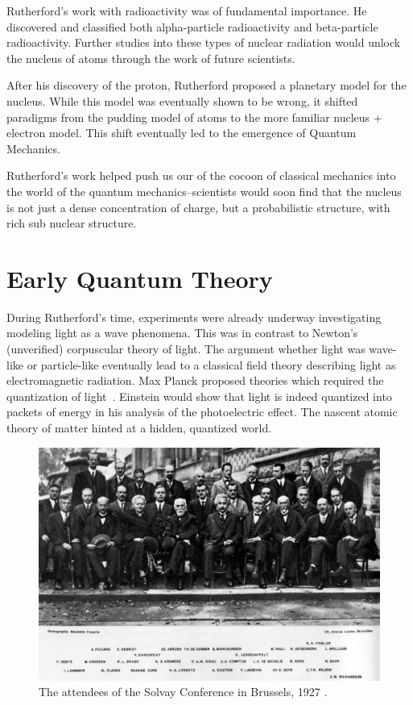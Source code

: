 Rutherford's work with radioactivity was of fundamental importance. He
discovered and classified both alpha-particle radioactivity and beta-particle
radioactivity. Further studies into these types of nuclear radiation would
unlock the nucleus of atoms through the work of future scientists.

After his discovery of the proton, Rutherford proposed a planetary model for the
nucleus. While this model was eventually shown to be wrong, it shifted paradigms
from the pudding model of atoms to the more familiar nucleus + electron model.
This shift eventually led to the emergence of Quantum Mechanics.

Rutherford's work helped push us our of the cocoon of classical mechanics into
the world of the quantum mechanics--scientists would soon find that the nucleus
is not just a dense concentration of charge, but a probabilistic structure, with
rich sub nuclear structure.

\clearpage
\section{Early Quantum Theory}

During Rutherford's time, experiments were already underway investigating
modeling light as a wave phenomena. This was in contrast to Newton's
(unverified) corpuscular theory of light. The argument whether light was
wave-like or particle-like eventually lead to a classical field theory
describing light as electromagnetic radiation. Max Planck proposed theories
which required the quantization of light~\cite{Planck1901}.  Einstein would show
that light is indeed quantized into packets of energy in his analysis of the
photoelectric effect. The nascent atomic theory of matter hinted at a hidden,
quantized world.

\begin{figure}
	\centering
	\includegraphics[width=\linewidth]{./figures/solvay.jpg}
	\caption{
		The attendees of the Solvay Conference in Brussels, 1927
		 \cite{BenjaminCroupie1927}.
	}
	\label{fig:solvay}
\end{figure}

